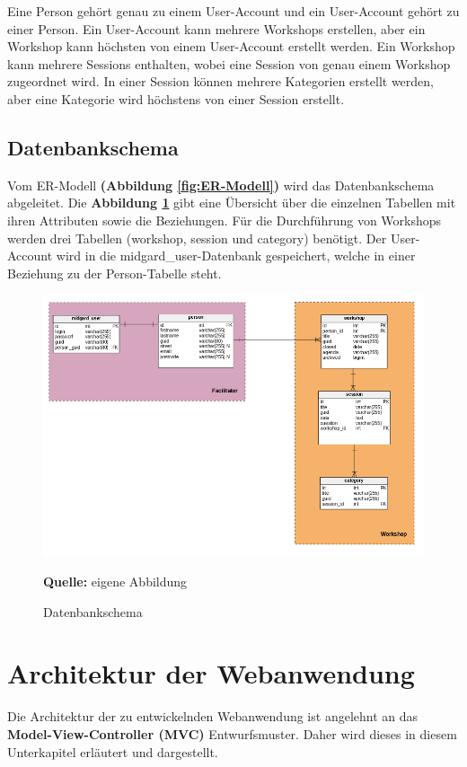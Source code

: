 Eine Person gehört genau zu einem User-Account und ein User-Account gehört zu einer Person. Ein User-Account kann mehrere Workshops erstellen, aber ein Workshop kann höchsten von einem User-Account erstellt werden. Ein Workshop kann mehrere Sessions enthalten, wobei eine Session von genau einem Workshop zugeordnet wird. In einer Session können mehrere Kategorien erstellt werden, aber eine Kategorie wird höchstens von einer Session erstellt. 

\newpage
\subsection{Datenbankschema}
\label{subsec:Datenbankschema}
Vom ER-Modell \textbf{(Abbildung \ref{fig:ER-Modell})} wird das Datenbankschema abgeleitet. Die \textbf{Abbildung \ref{fig:datenbankschema}} gibt eine Übersicht über die einzelnen Tabellen mit ihren Attributen sowie die Beziehungen. Für die Durchführung von Workshops werden drei Tabellen (workshop, session und category) benötigt. Der User-Account wird in die midgard\_user-Datenbank gespeichert, welche in einer Beziehung zu der Person-Tabelle steht.\bigskip

\begin{figure}[H]
  \begin{center}
    \includegraphics[scale=0.45]{img/datenbankschema}
	\caption{Datenbankschema} 
	\footnotesize\sffamily\textbf{Quelle:} eigene Abbildung  
	\label{fig:datenbankschema}
  \end{center}   
\end{figure}

\newpage
\section{Architektur der Webanwendung}
\label{sec:Architektur der Webanwendung}
Die Architektur der zu entwickelnden Webanwendung ist angelehnt an das \textbf{Model-View-Controller (MVC)} Entwurfsmuster. Daher wird dieses in diesem Unterkapitel erläutert und dargestellt.\bigskip

